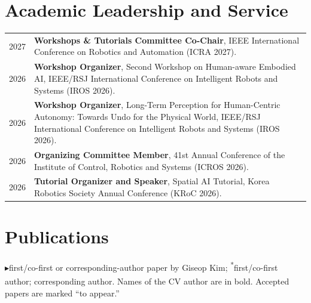 \documentclass[10pt,a4paper]{article}
\newcommand{\daterow}[2]{#1 & #2 \\[2.2pt]}
\newcommand{\leadpub}{\textbf{\ensuremath{\blacktriangleright}}\hspace{0.25em}}
\begin{document}
\section{Academic Leadership and Service}
\begin{tabularx}{\textwidth}{@{}L{34mm}Y@{}}
\daterow{2027}{\textbf{Workshops \& Tutorials Committee Co-Chair}, IEEE International Conference on Robotics and Automation (ICRA 2027).}
\daterow{2026}{\textbf{Workshop Organizer}, Second Workshop on Human-aware Embodied AI, IEEE/RSJ International Conference on Intelligent Robots and Systems (IROS 2026).}
\daterow{2026}{\textbf{Workshop Organizer}, Long-Term Perception for Human-Centric Autonomy: Towards Undo for the Physical World, IEEE/RSJ International Conference on Intelligent Robots and Systems (IROS 2026).}
\daterow{2026}{\textbf{Organizing Committee Member}, 41st Annual Conference of the Institute of Control, Robotics and Systems (ICROS 2026).}
\daterow{2026}{\textbf{Tutorial Organizer and Speaker}, Spatial AI Tutorial, Korea Robotics Society Annual Conference (KRoC 2026).}
\end{tabularx}

\section{Publications}
{\small \leadpub first/co-first or corresponding-author paper by Giseop Kim; \textsuperscript{*}first/co-first author; \textsuperscript{\dag}corresponding author. Names of the CV author are in bold. Accepted papers are marked ``to appear.''}
\end{document}
